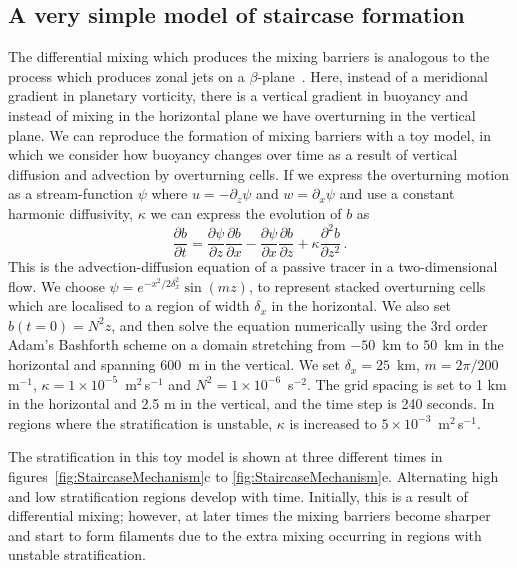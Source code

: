 \subsection{A very simple model of staircase formation}
The differential mixing which produces the mixing barriers is analogous to the process which produces zonal jets on a $\beta$-plane~\citep{Manfroi1999}. Here, instead of a meridional gradient in planetary vorticity, there is a vertical gradient in buoyancy and instead of mixing in the horizontal plane we have overturning in the vertical plane. We can reproduce the formation of mixing barriers with a toy model, in which we consider how buoyancy changes over time as a result of vertical diffusion and advection by overturning cells. If we express the overturning motion as a stream-function $\psi$ where $u = - \partial_z \psi$ and $w = \partial_x \psi$ and use a constant harmonic diffusivity, $\kappa$ we can express the evolution of $b$ as
\begin{equation}
    \frac{\partial b}{\partial t} = \frac{\partial \psi}{\partial z} \frac{\partial b}{\partial x} - \frac{\partial \psi}{\partial x} \frac{\partial b}{\partial z} + \kappa \frac{\partial^2 b}{\partial z^2} \, .
\end{equation}
This is the advection-diffusion equation of a passive tracer in a two-dimensional flow. We choose $\psi = e^{- x^2 / 2\delta_x^2} \sin(m z)$, to represent stacked overturning cells which are localised to a region of width $\delta_x$ in the horizontal. We also set $b(t=0) = N^2 z$, and then solve the equation numerically using the 3rd order Adam's Bashforth scheme on a domain stretching from $-50$~km to $50$~km in the horizontal and spanning $600$~m in the vertical. We set $\delta_x = 25$~km, $m = 2 \pi / 200$ m$^{-1}$, $\kappa = 1 \times 10^{-5}$~m$^2$\,s$^{-1}$ and $N^2 = 1 \times 10^{-6}$~s$^{-2}$. The grid spacing is set to 1 km in the horizontal and 2.5 m in the vertical, and the time step is 240 seconds. In regions where the stratification is unstable, $\kappa$ is increased to $5 \times 10^{-3}$~m$^2$\,s$^{-1}$.

The stratification in this toy model is shown at three different times in figures~\ref{fig:StaircaseMechanism}c to \ref{fig:StaircaseMechanism}e. Alternating high and low stratification regions develop with time. Initially, this is a result of differential mixing; however, at later times the mixing barriers become sharper and start to form filaments due to the extra mixing occurring in regions with unstable stratification.

